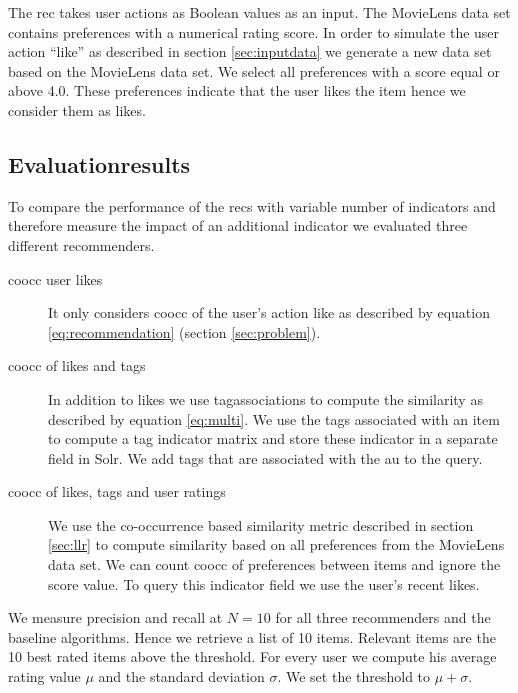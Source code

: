 The \gls{rec} takes user actions as Boolean values as an input. The MovieLens data set contains preferences with a numerical rating score. 
In order to simulate the user action ``like'' as described in section \ref{sec:inputdata} we generate a new data set based on the MovieLens data set. We select all preferences with a score equal or above 4.0. These \glspl{preference} indicate that the user likes the item hence we consider them as likes.

\subsection{Evaluationresults}
\label{sec:results}
To compare the performance of the \glspl{rec} with variable number of \glspl{indicator} and therefore measure the impact of an additional indicator we evaluated three different recommenders. 

\begin{description}
\item[\Gls{coocc} user likes] It only considers \gls{coocc} of the user's action \gls{like} as described by equation \ref{eq:recommendation} (section \ref{sec:problem}).
\item[\Gls{coocc} of likes and tags] In addition to likes we use tag\-asso\-cia\-tions to compute the similarity as described by equation \ref{eq:multi}. We use the tags associated with an item to compute a tag \gls{indicator} matrix and store these indicator in a separate field in Solr. We add tags that are associated with the \gls{au} to the query.
\item[\Gls{coocc} of likes, tags and user ratings] We use the co\--oc\-cur\-ren\-ce based similarity metric described in section \ref{sec:llr} to compute similarity based on all preferences from the MovieLens data set. We can count \gls{coocc} of preferences between items and ignore the score value. To query this \gls{indicator} field we use the user's recent likes.
\end{description}

We measure precision and recall at $N=10$ for all three recommenders and the baseline algorithms. Hence we retrieve a list of 10 items. Relevant items are the 10 best rated items above the threshold. For every user we compute his average rating value $\mu$ and the standard deviation $\sigma$. We set the threshold to $\mu + \sigma$.

